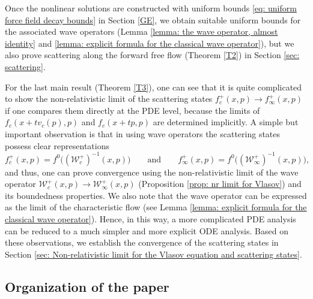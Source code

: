 \documentclass[reqno, 11pt, letterpaper]{amsart}
\theoremstyle{remark}
\numberwithin{equation}{section}
\numberwithin{theorem}{section}
\numberwithin{table}{section}
\numberwithin{figure}{section}
\begin{document}
Once the nonlinear solutions are constructed with uniform bounds \eqref{eq: uniform force field decay bounds} in Section \ref{GE}, we obtain suitable uniform bounds for the associated wave operators (Lemma \ref{lemma:  the wave operator, almost identity} and \ref{lemma: explicit formula for the classical wave operator}), but we also prove scattering along the forward free flow (Theorem \ref{T2}) in Section \ref{sec: scattering}. 

For the last main result (Theorem \ref{T3}), one can see that it is quite complicated to show the non-relativistic limit of the scattering states $f_c^+(x,p)\to f_\infty^+(x,p)$ if one compares them directly at the PDE level, because the limits of $f_c(x+tv_c(p),p)$ and $f_c(x+tp,p)$ are determined implicitly. A simple but important observation is that in using wave operators the scattering states possess clear representations 
$$f_c^+(x,p)=f^0\big((\mathcal{W}_c^+)^{-1}(x,p)\big) \qquad \mathrm{and} \qquad f_\infty^+(x,p)=f^0\big((\mathcal{W}_\infty^+)^{-1}(x,p)\big),$$
and thus, one can prove convergence using the non-relativistic limit of the wave operator $\mathcal{W}_c^+(x,p)\to \mathcal{W}_\infty^+(x,p)$ (Proposition \ref{prop: nr limit for Vlasov}) and its boundedness properties. We also note that the wave operator can be expressed as the limit of the characteristic flow (see Lemma \ref{lemma: explicit formula for the classical wave operator}). Hence, in this way, a more complicated PDE analysis can be reduced to a much simpler and more explicit ODE analysis. Based on these observations, we establish the convergence of the scattering states in Section \ref{sec: Non-relativistic limit for the Vlasov equation and scattering states}.

\subsection{Organization of the paper}
\end{document}
